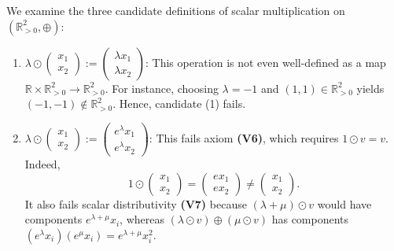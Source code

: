 \begin{exercisesolution*}
\label{sol:positive_reals_vector_space_mc}
We examine the three candidate definitions of scalar multiplication on $(\mathbb{R}_{>0}^2, \oplus)$:

\begin{enumerate}[label=\textbf{(\arabic*)}]
    \item $\lambda \odot \left(\begin{smallmatrix} x_1 \\ x_2 \end{smallmatrix}\right) := \left(\begin{smallmatrix} \lambda x_1 \\ \lambda x_2 \end{smallmatrix}\right)$:
    This operation is not even well-defined as a map $\mathbb{R} \times \mathbb{R}_{>0}^2 \to \mathbb{R}_{>0}^2$. For instance, choosing $\lambda = -1$ and $(1, 1) \in \mathbb{R}_{>0}^2$ yields $(-1, -1) \notin \mathbb{R}_{>0}^2$. Hence, candidate (1) fails.

    \item $\lambda \odot \left(\begin{smallmatrix} x_1 \\ x_2 \end{smallmatrix}\right) := \left(\begin{smallmatrix} e^{\lambda} x_1 \\ e^{\lambda} x_2 \end{smallmatrix}\right)$:
    This fails axiom \textbf{(V6)}, which requires $1 \odot v = v$. Indeed,
    \[
    1 \odot \begin{pmatrix} x_1 \\ x_2 \end{pmatrix} = \begin{pmatrix} e x_1 \\ e x_2 \end{pmatrix} \ne \begin{pmatrix} x_1 \\ x_2 \end{pmatrix}.
    \]
    It also fails scalar distributivity \textbf{(V7)} because $(\lambda + \mu) \odot v$ would have components $e^{\lambda+\mu} x_i$, whereas $(\lambda \odot v) \oplus (\mu \odot v)$ has components $(e^\lambda x_i)(e^\mu x_i) = e^{\lambda+\mu} x_i^2$.


\end{enumerate}
\end{exercisesolution*}
